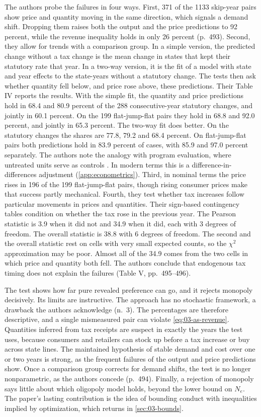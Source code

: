  The authors probe the failures in four ways. First, 371 of the 1133 skip-year pairs
show price and quantity moving in the same direction, which signals a demand shift. Dropping them raises both
the output and the price predictions to 92 percent, while the revenue inequality holds in only 26 percent
(p.~493). Second, they allow for trends with a comparison group. In a simple version, the predicted change without a
tax change is the mean change in states that kept their statutory rate that year. In a two-way version, it is
the fit of a model with state and year effects to the state-years without a statutory change. The tests then ask whether quantity fell below, and price
rose above, these predictions. Their Table IV reports the results. With the simple fit, the quantity and price
predictions hold in 68.4 and 80.9 percent of the 288 consecutive-year statutory changes, and jointly in 60.1
percent. On the 199 flat-jump-flat pairs they hold in 68.8 and 92.0 percent, and jointly in 65.3 percent. The
two-way fit does better. On the statutory changes the shares are 77.8, 79.2 and 68.4 percent. On flat-jump-flat
pairs both predictions hold in 83.9 percent of cases, with 85.9 and 97.0 percent separately. The authors note the analogy with
program evaluation, where untreated units serve as controls \citep{Ashenfelter1978}. In modern terms this is a
difference-in-differences adjustment (\cref{app:econometrics}). Third, in nominal terms the price rises in 196
of the 199 flat-jump-flat pairs, though rising consumer prices make that success partly mechanical. Fourth,
they test whether tax increases follow particular movements in prices and quantities. Their sign-based
contingency tables condition on whether the tax rose in the previous year. The Pearson statistic is 3.9 when it
did not and 34.9 when it did, each with 3 degrees of freedom. The overall statistic is 38.8 with 6 degrees of
freedom. The second and the overall statistic rest on cells with very small expected counts, so the
$\chi^2$ approximation may be poor. Almost all of the 34.9 comes from the two cells in which price and quantity
both fell. The authors conclude that endogenous tax timing does not explain the failures (Table V,
pp.~495--496).

 The test shows how far pure revealed preference can go, and it rejects monopoly
decisively. Its limits are instructive. The approach has no stochastic framework, a drawback the authors
acknowledge (n.~3). The percentages are therefore descriptive, and a single mismeasured pair can violate
\eqref{eq:03-as-revenue}. Quantities
inferred from tax receipts are suspect in exactly the years the test uses, because consumers and retailers
can stock up before a tax increase or buy across state lines. The maintained hypothesis of stable demand and
cost over one or two years is strong, as the frequent failures of the output and price predictions show.
Once a comparison group corrects for demand shifts, the test is no longer nonparametric, as the authors
concede (p.~494). Finally, a rejection of monopoly says little about which oligopoly model holds, beyond the
lower bound on $N_e$. The paper's lasting contribution is the idea of bounding conduct with inequalities
implied by optimization, which returns in \cref{sec:03-bounds}.

